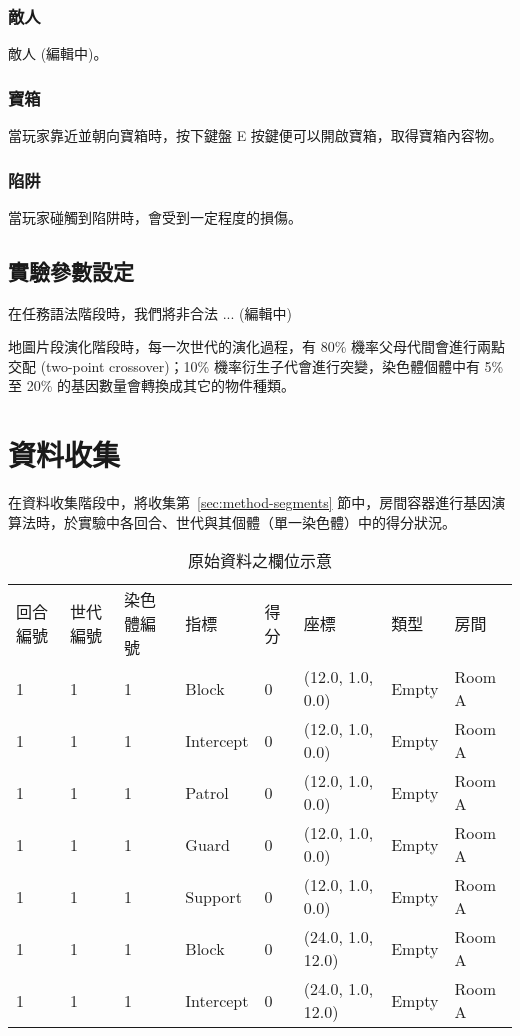 \subsubsection{敵人}
\label{sssec:experiment-gameobjects-enemy}

敵人 (編輯中)。

\subsubsection{寶箱}
\label{sssec:experiment-gameobjects-treasure}

當玩家靠近並朝向寶箱時，按下鍵盤 E 按鍵便可以開啟寶箱，取得寶箱內容物。

\subsubsection{陷阱}
\label{sssec:experiment-gameobjects-trap}

當玩家碰觸到陷阱時，會受到一定程度的損傷。

\subsection{實驗參數設定}
\label{ssec:experiment-parameters}

在任務語法階段時，我們將非合法 ... (編輯中)

地圖片段演化階段時，每一次世代的演化過程，有 80\% 機率父母代間會進行兩點交配 (two-point crossover)；10\% 機率衍生子代會進行突變，染色體個體中有 5\% 至 20\% 的基因數量會轉換成其它的物件種類。

\section{資料收集}
\label{sec:experiment-datacollection}

在資料收集階段中，將收集第~\ref{sec:method-segments} 節中，房間容器進行基因演算法時，於實驗中各回合、世代與其個體（單一染色體）中的得分狀況。

\begin{table}[ht]
  \centering
  \caption{原始資料之欄位示意}
  \label{tbl:structure-of-rawdata}
  \bigskip
  \begin{tabular}{| l | l | l | l | l | l | l | l |}
    \hline
    回合編號 & 世代編號 & 染色體編號 & 指標 & 得分 & 座標 & 類型 & 房間 \\
    1 & 1 & 1 & Block     & 0 & (12.0, 1.0, 0.0)  & Empty & Room A \\
    1 & 1 & 1 & Intercept & 0 & (12.0, 1.0, 0.0)  & Empty & Room A \\
    1 & 1 & 1 & Patrol    & 0 & (12.0, 1.0, 0.0)  & Empty & Room A \\
    1 & 1 & 1 & Guard     & 0 & (12.0, 1.0, 0.0)  & Empty & Room A \\
    1 & 1 & 1 & Support   & 0 & (12.0, 1.0, 0.0)  & Empty & Room A \\
    1 & 1 & 1 & Block     & 0 & (24.0, 1.0, 12.0) & Empty & Room A \\
    1 & 1 & 1 & Intercept & 0 & (24.0, 1.0, 12.0) & Empty & Room A \\
    \hline
  \end{tabular}
\end{table}

